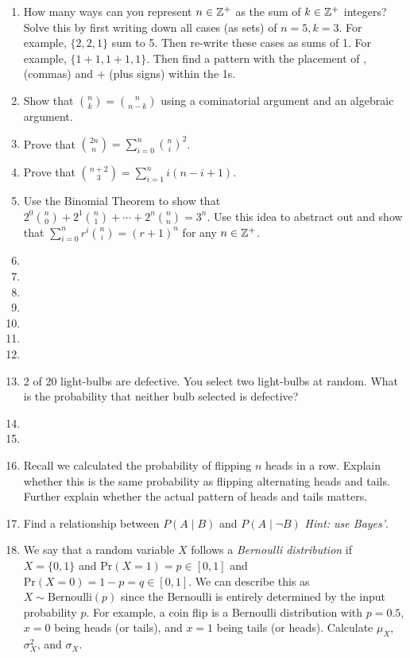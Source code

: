 \documentclass[main.tex]{subfiles}
\begin{document}
\begin{enumerate}
	\item How many ways can you represent \(n \in \mathbb{Z}^+\) as the sum of \(k \in \mathbb{Z}^+\) integers? Solve this by first writing down all cases (as sets) of \(n=5,k=3\). For example, \(\{2,2,1\}\) sum to 5. Then re-write these cases as sums of 1. For example, \(\{1+1,1+1,1\}\). Then find a pattern with the placement of \(,\) (commas) and \(+\) (plus signs) within the 1s.
	\item Show that \(\binom{n}{k} =  \binom{n}{n-k}\) using a cominatorial argument and an algebraic argument.
	\item Prove that \(\binom{2n}{n} = \sum_{i=0}^{n} \binom{n}{i}^2\).
	\item Prove that \(\binom{n+2}{3} = \sum_{i=1}^{n} i(n-i+1)\).
	
	\item Use the Binomial Theorem to show that \(2^0\binom{n}{0} + 2^1\binom{n}{1} + \cdots + 2^n\binom{n}{n} = 3^n\). Use this idea to abstract out and show that \(\sum_{i=0}^{n} r^i \binom{n}{i} = (r+1)^n\) for any \(n \in \mathbb{Z}^+\).
	\item %
	\item %
	\item %
	\item %
	\item %
	\item %
	\item %
	\item 2 of 20 light-bulbs are defective. You select two light-bulbs at random. What is the probability that neither bulb selected is defective? %
	\item %
	\item %
	\item Recall we calculated the probability of flipping \(n\) heads in a row. Explain whether this is the same probability as flipping alternating heads and tails. Further explain whether the actual pattern of heads and tails matters.
	\item Find a relationship between \(P(A \mid B)\) and \(P(A \mid \lnot B)\) \textit{Hint: use Bayes'}.
	
	\item We say that a random variable \(X\) follows a \textit{Bernoulli distribution} if \(X = \{0,1\}\) and \(\mathrm{Pr}(X = 1) = p \in [0,1]\) and \(\mathrm{Pr}(X = 0) = 1-p = q \in [0,1]\). We can describe this as \(X \sim \text{Bernoulli}(p)\) since the Bernoulli is entirely determined by the input probability \(p\). For example, a coin flip is a Bernoulli distribution with \(p=0.5\), \(x=0\) being heads (or tails), and \(x=1\) being tails (or heads). Calculate \(\mu_X\), \(\sigma_X^2\), and \(\sigma_X\).
	

\end{enumerate}
\end{document}
